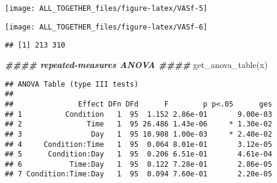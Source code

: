 \documentclass[
]{article}
\newenvironment{Shaded}{\begin{snugshade}}{\end{snugshade}}
\newcommand{\AttributeTok}[1]{\textcolor[rgb]{0.77,0.63,0.00}{#1}}
\newcommand{\CommentTok}[1]{\textcolor[rgb]{0.56,0.35,0.01}{\textit{#1}}}
\newcommand{\ConstantTok}[1]{\textcolor[rgb]{0.00,0.00,0.00}{#1}}
\newcommand{\DocumentationTok}[1]{\textcolor[rgb]{0.56,0.35,0.01}{\textbf{\textit{#1}}}}
\newcommand{\FunctionTok}[1]{\textcolor[rgb]{0.00,0.00,0.00}{#1}}
\newcommand{\NormalTok}[1]{#1}
\newcommand{\OtherTok}[1]{\textcolor[rgb]{0.56,0.35,0.01}{#1}}
\newcommand{\SpecialCharTok}[1]{\textcolor[rgb]{0.00,0.00,0.00}{#1}}
\newcommand{\StringTok}[1]{\textcolor[rgb]{0.31,0.60,0.02}{#1}}
\begin{document}
\begin{Shaded}
\end{Shaded}

\texttt{[image: ALL\_TOGETHER\_files/figure-latex/VASf-5]}

\begin{Shaded}
\end{Shaded}

\texttt{[image: ALL\_TOGETHER\_files/figure-latex/VASf-6]}

\begin{verbatim}
## [1] 213 310
\end{verbatim}

\begin{Shaded}
\begin{Highlighting}[]
\DocumentationTok{\#\#\#\# repeated{-}measures ANOVA \#\#\#\#}
\FunctionTok{get\_anova\_table}\NormalTok{(x)}
\end{Highlighting}
\end{Shaded}

\begin{verbatim}
## ANOVA Table (type III tests)
## 
##               Effect DFn DFd      F        p p<.05      ges
## 1          Condition   1  95  1.152 2.86e-01       9.00e-03
## 2               Time   1  95 26.486 1.43e-06     * 1.30e-02
## 3                Day   1  95 10.908 1.00e-03     * 2.40e-02
## 4     Condition:Time   1  95  0.064 8.01e-01       3.12e-05
## 5      Condition:Day   1  95  0.206 6.51e-01       4.61e-04
## 6           Time:Day   1  95  0.122 7.28e-01       2.86e-05
## 7 Condition:Time:Day   1  95  0.094 7.60e-01       2.20e-05
\end{verbatim}
\end{document}
